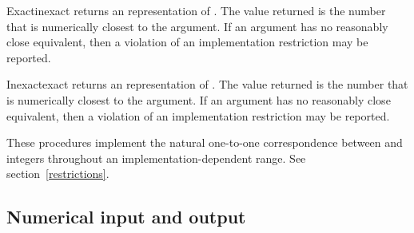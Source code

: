 \begin{entry}{%
}

{\cf Exact\coerce{}inexact} returns an  representation of .
The value returned is the
 number that is numerically closest to the argument.  
If an  argument has no reasonably close  equivalent,
then a violation of an implementation restriction may be reported.

{\cf Inexact\coerce{}exact} returns an  representation of
.  The value returned is the  number that is numerically
closest to the argument.
If an  argument has no reasonably close  equivalent,
then a violation of an implementation restriction may be reported.


These procedures implement the natural one-to-one correspondence between
 and  integers throughout an
implementation-dependent range.  See section~\ref{restrictions}.

\end{entry}

\medskip

\subsection{Numerical input and output}

